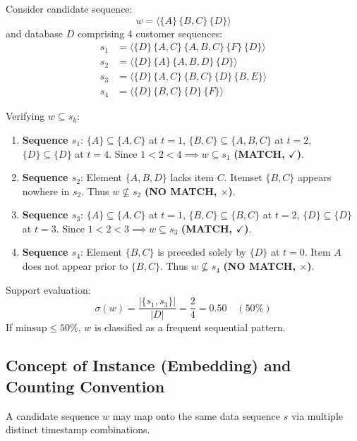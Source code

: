 \begin{example}
Consider candidate sequence:
\begin{equation}
w = \langle \{A\} \, \{B, C\} \, \{D\} \rangle
\end{equation}
and database $D$ comprising 4 customer sequences:
\begin{align*}
s_1 &= \langle \{D\} \, \{A, C\} \, \{A, B, C\} \, \{F\} \, \{D\} \rangle \\
s_2 &= \langle \{D\} \, \{A\} \, \{A, B, D\} \, \{D\} \rangle \\
s_3 &= \langle \{D\} \, \{A, C\} \, \{B, C\} \, \{D\} \, \{B, E\} \rangle \\
s_4 &= \langle \{D\} \, \{B, C\} \, \{D\} \, \{F\} \rangle
\end{align*}

Verifying $w \subseteq s_k$:
\begin{enumerate}
    \item \textbf{Sequence $s_1$}:
    $\{A\} \subseteq \{A, C\}$ at $t=1$, $\{B, C\} \subseteq \{A, B, C\}$ at $t=2$, $\{D\} \subseteq \{D\}$ at $t=4$.
    Since $1 < 2 < 4 \implies w \subseteq s_1$ \textbf{(MATCH, $\checkmark$)}.
    
    \item \textbf{Sequence $s_2$}:
    Element $\{A, B, D\}$ lacks item $C$. Itemset $\{B, C\}$ appears nowhere in $s_2$.
    Thus $w \not\subseteq s_2$ \textbf{(NO MATCH, $\times$)}.
    
    \item \textbf{Sequence $s_3$}:
    $\{A\} \subseteq \{A, C\}$ at $t=1$, $\{B, C\} \subseteq \{B, C\}$ at $t=2$, $\{D\} \subseteq \{D\}$ at $t=3$.
    Since $1 < 2 < 3 \implies w \subseteq s_3$ \textbf{(MATCH, $\checkmark$)}.
    
    \item \textbf{Sequence $s_4$}:
    Element $\{B, C\}$ is preceded solely by $\{D\}$ at $t=0$. Item $A$ does not appear prior to $\{B, C\}$.
    Thus $w \not\subseteq s_4$ \textbf{(NO MATCH, $\times$)}.
\end{enumerate}

Support evaluation:
\begin{equation}
\sigma(w) = \frac{|\{s_1, s_3\}|}{|D|} = \frac{2}{4} = 0.50 \quad (50\%)
\end{equation}
If $\text{minsup} \le 50\%$, $w$ is classified as a frequent sequential pattern.
\end{example}

\subsection{Concept of Instance (Embedding) and Counting Convention}
A candidate sequence $w$ may map onto the same data sequence $s$ via multiple distinct timestamp combinations.

